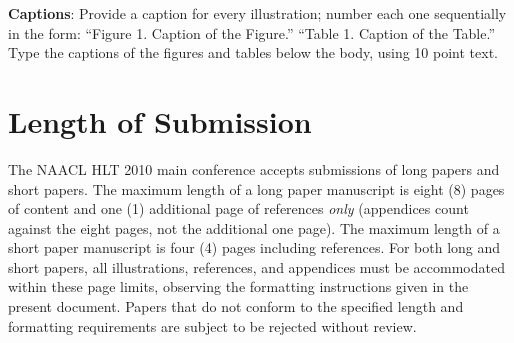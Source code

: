 \documentclass[11pt,letterpaper]{article}
\begin{document}
{\bf Captions}: Provide a caption for every illustration; number each one
sequentially in the form:  ``Figure 1. Caption of the Figure.'' ``Table 1.
Caption of the Table.''  Type the captions of the figures and 
tables below the body, using 10 point text.  

\section{Length of Submission}
\label{sec:length}

The NAACL HLT 2010 main conference accepts submissions of long papers
and short papers.  The maximum length of a long paper manuscript is
eight (8) pages of content and one (1) additional page of references
\emph{only} (appendices count against the eight pages, not the
additional one page).  The maximum length of a short paper manuscript
is four (4) pages including references.  For both long and short
papers, all illustrations, references, and appendices must be
accommodated within these page limits, observing the formatting
instructions given in the present document.  Papers that do not
conform to the specified length and formatting requirements are
subject to be rejected without review.
\end{document}
